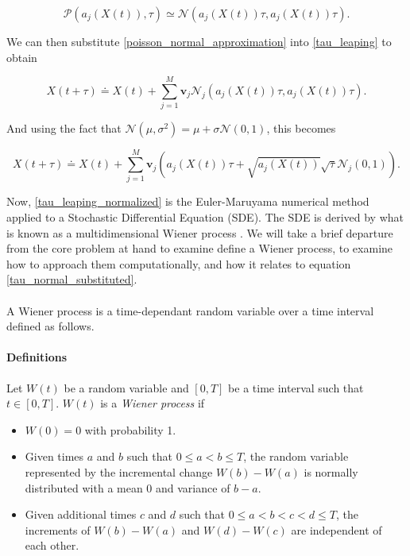 \documentclass[ugrad,lot,lof,openright,11pt,oneside,onehalfspace]{RUthesis}
\begin{document}
				\begin{equation}\label{poisson_normal_approximation}
				\mathcal{P}(a_j(X(t)),\tau) \simeq \mathcal{N}(a_j(X(t))\tau,a_j(X(t))\tau).
				\end{equation}

				\noindent
				We can then substitute \eqref{poisson_normal_approximation} into \eqref{tau_leaping} to obtain 

				\begin{equation}\label{tau_normal_substituted}
				X(t+\tau) \doteq X(t) + \sum\limits_{j=1}^{M} \mathbf{v}_j \mathcal{N}_j(a_j(X(t))\tau,a_j(X(t))\tau).
				\end{equation}

				\noindent
				And using the fact that $\mathcal{N}(\mu,\sigma^2) = \mu + \sigma \mathcal{N}(0,1)$, this becomes

				\begin{equation}\label{tau_leaping_normalized}
				X(t+\tau) \doteq X(t) + \sum\limits_{j=1}^{M} \mathbf{v}_j \left( a_j(X(t))\tau + \sqrt{a_j(X(t))}\sqrt{\tau} \mathcal{N}_j(0,1) \right).
				\end{equation}

				\noindent
				Now, \eqref{tau_leaping_normalized} is the Euler-Maruyama numerical method applied to a Stochastic Differential Equation (SDE). The SDE is derived by what is known as a multidimensional Wiener process \cite{weiner_process}. We will take a brief departure from the core problem at hand to examine define a Wiener process, to examine how to approach them computationally, and how it relates to equation \eqref{tau_normal_substituted}.\\
				\\
				A Wiener process is a time-dependant random variable over a time interval defined as follows.

				\paragraph{Definitions}
				Let $W(t)$ be a random variable and $[0,T]$ be a time interval such that $t \in [0,T]$. $W(t)$ is a \textit{Wiener process} if

				\begin{itemize}
					\item $W(0) = 0$ with probability 1.
					\item Given times $a$ and $b$ such that $0 \leq a < b \leq T$, the random variable represented by the incremental change $W(b)-W(a)$ is normally distributed with a mean 0 and variance of $b-a$.
					\item Given additional times $c$ and $d$ such that $0 \leq a < b < c < d\leq T$, the increments of $W(b)-W(a)$ and $W(d)-W(c)$ are independent of each other.
				\end{itemize}
\end{document}
